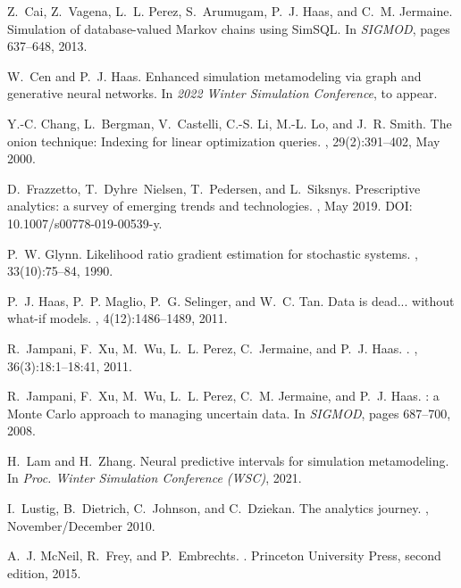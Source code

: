 \documentclass[11pt]{article}
\begin{document}
{\begin{thebibliography}{10}
Z.~Cai, Z.~Vagena, L.~L. Perez, S.~Arumugam, P.~J. Haas, and C.~M. Jermaine.
\newblock Simulation of database-valued {M}arkov chains using {SimSQL}.
\newblock In {\em SIGMOD}, pages 637--648, 2013.

W.~Cen and P.~J. Haas.
\newblock Enhanced simulation metamodeling via graph and generative neural networks.
\newblock In {\em 2022 Winter Simulation Conference}, to appear.

Y.-C. Chang, L.~Bergman, V.~Castelli, C.-S. Li, M.-L. Lo, and J.~R. Smith.
\newblock The onion technique: Indexing for linear optimization queries.
, 29(2):391–402, May 2000.

D.~Frazzetto, T.~Dyhre~Nielsen, T.~Pedersen, and L.~Siksnys.
\newblock Prescriptive analytics: a survey of emerging trends and technologies.
, May 2019.
\newblock DOI: 10.1007/s00778-019-00539-y.

P.~W. Glynn.
\newblock Likelihood ratio gradient estimation for stochastic systems.
, 33(10):75--84, 1990.

P.~J. Haas, P.~P. Maglio, P.~G. Selinger, and W.~C. Tan.
\newblock Data is dead... without what-if models.
, 4(12):1486--1489, 2011.

R.~Jampani, F.~Xu, M.~Wu, L.~L. Perez, C.~Jermaine, and P.~J. Haas.
.
, 36(3):18:1--18:41, 2011.

R.~Jampani, F.~Xu, M.~Wu, L.~L. Perez, C.~M. Jermaine, and P.~J. Haas.
: a {M}onte {C}arlo approach to managing uncertain data.
\newblock In {\em SIGMOD}, pages 687--700, 2008.

H.~Lam and H.~Zhang.
\newblock Neural predictive intervals for simulation metamodeling.
\newblock In {\em Proc. Winter Simulation Conference (WSC)}, 2021.

I.~Lustig, B.~Dietrich, C.~Johnson, and C.~Dziekan.
\newblock The analytics journey.
, November/December 2010.

A.~J. McNeil, R.~Frey, and P.~Embrechts.
.
\newblock Princeton University Press, second edition, 2015.


\end{thebibliography}}
\end{document}
